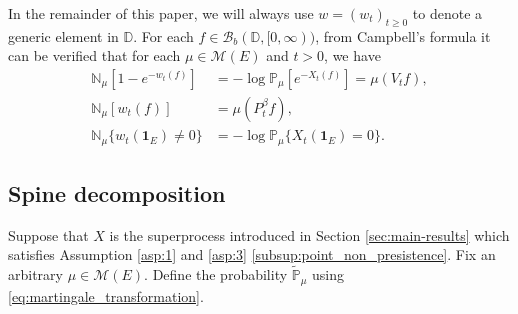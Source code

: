\documentclass[12pt,a4paper]{amsart}
\numberwithin{equation}{section}
\theoremstyle{plain}
\theoremstyle{definition}
\begin{document}

In the remainder of this paper, we will always use $w = (w_t)_{t\geq 0}$ to denote a generic element in $\mathbb D$.
For each $f\in \mathcal B_b(\mathbb D, [0,\infty))$, from Campbell's formula it can be verified that for each $\mu\in \mathcal M(E)$ and $t>0$, we have
\begin{align}\label{eq: kuznetsov Laplace}
 	\mathbb N_\mu[1-e^{-w_t(f) }]
 	&=-\log \mathbb P_\mu[e^{-X_t(f)}] 
    = \mu(V_t f),
 	\\ \mathbb N_\mu[w_t(f)]
 	&=\mu(P_t^{\beta}f),
 	\\\mathbb N_\mu\{w_t(\mathbf 1_E) \neq 0\}
 	&=-\log\mathbb P_\mu\{X_t(\mathbf 1_E) = 0\}.
\end{align}

\subsection{Spine decomposition}
Suppose that $X$ is the superprocess introduced in Section \ref{sec:main-results} which satisfies Assumption \ref{asp:1} and \ref{asp:3} \eqref{subsup:point_non_presistence}.
Fix an arbitrary $\mu\in \mathcal M(E)$.
Define the probability $\widetilde {\mathbb P}_\mu$ using \eqref{eq:martingale_transformation}.
\end{document}
